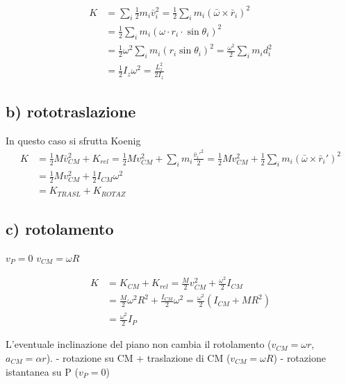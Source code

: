 \begin{align*}
K &= \sum_i \frac{1}{2} m_i \bar{v}_i^2 = \frac{1}{2} \sum_i m_i ( \bar{\omega} \times \bar{r}_i )^2 \\
&= \frac{1}{2} \sum_i m_i ( \omega \cdot r_i \cdot \sin \theta_i )^2 \\
&= \frac{1}{2} \omega^2 \sum_i m_i ( r_i \sin \theta_i )^2 = \frac{\omega^2}{2} \sum_i m_i d_i^2 \\
&= \frac{1}{2} I_z \omega^2 = \frac{L_z^2}{2 I_z}
\end{align*}

\subsection*{b) rototraslazione}
In questo caso si sfrutta Koenig
\begin{align*}
K &= \frac{1}{2} M \bar{v}_{CM}^2 + K_{rel} = \frac{1}{2} M v_{CM}^2 + \sum_i m_i \frac{\bar{v}_i'^2}{2} = \frac{1}{2} M v_{CM}^2 + \frac{1}{2} \sum_i m_i ( \bar{\omega} \times \bar{r}_i' )^2 \\
&= \frac{1}{2} M v_{CM}^2 + \frac{1}{2} I_{CM} \omega^2 \\
&= K_{TRASL} + K_{ROTAZ}
\end{align*}

\subsection*{c) rotolamento}
\begin{figure}[H]
\centering
{}
\end{figure}

$v_P = 0$ \quad $v_{CM} = \omega R$

\begin{align*}
K &= K_{CM} + K_{rel} = \frac{M}{2} v_{CM}^2 + \frac{\omega^2}{2} I_{CM} \\
&= \frac{M}{2} \omega^2 R^2 + \frac{I_{CM}}{2} \omega^2 = \frac{\omega^2}{2} ( I_{CM} + M R^2 ) \\
&= \frac{\omega^2}{2} I_P
\end{align*}

L'eventuale inclinazione del piano non cambia il rotolamento ($v_{CM} = \omega r$, $a_{CM} = \alpha r$).
- rotazione su CM + traslazione di CM ($v_{CM} = \omega R$)
- rotazione istantanea su P ($v_P = 0$)
